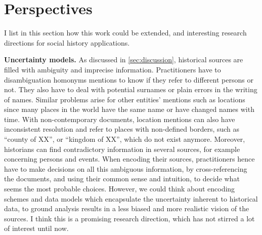 \section{Perspectives}\label{sec:perspectives}

I list in this section how this work could be extended, and interesting research directions for social history \va applications.


\noindent\textbf{Uncertainty models.} As discussed in \autoref{sec:discussion}, historical sources are filled with ambiguity and imprecise information.
Practitioners have to disambiguation homonyms mentions to know if they refer to different persons or not. They also have to deal with potential surnames or plain errors in the writing of names.
Similar problems arise for other entities' mentions such as locations since many places in the world have the same name or have changed names with time.
With non-contemporary documents, location mentions can also have inconsistent resolution and refer to places with non-defined borders, such as ``county of XX'', or ``kingdom of XX'', which do not exist anymore.
Moreover, historians can find contradictory information in several sources, for example concerning persons and events.
When encoding their sources, practitioners hence have to make decisions on all this ambiguous information, by cross-referencing the documents, and using their common sense and intuition, to decide what seems the most probable choices.
However, we could think about encoding schemes and data models which encapsulate the uncertainty inherent to historical data, to ground analysis results in a less biased and more realistic vision of the sources.
I think this is a promising research direction, which has not stirred a lot of interest until now.


